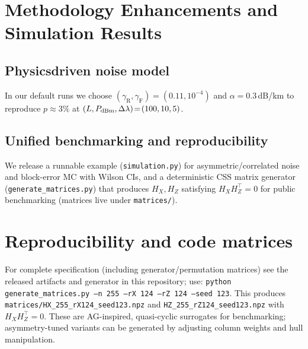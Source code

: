\documentclass[conference]{IEEEtran}
\begin{document}
\section{Methodology Enhancements and Simulation Results}\label{sec:enhancements}
\subsection{Physics\textendash driven noise model}
In our default runs we choose $(\gamma_{\mathrm{R}},\gamma_{\mathrm{F}})\!=\!(0.11,10^{-4})$ and $\alpha\!=\!0.3$\,dB/km to reproduce $p\!\approx\!3\%$ at $(L,P_{\rm dBm},\Delta\lambda)\!=\!(100,10,5)$.
\subsection{Unified benchmarking and reproducibility}
We release a runnable example (\texttt{simulation.py}) for asymmetric/correlated noise and block-error MC with Wilson CIs, and a deterministic CSS matrix generator (\texttt{generate\_matrices.py}) that produces $H_X,H_Z$ satisfying $H_XH_Z^\top\!=\!0$ for public benchmarking (matrices live under \texttt{matrices/}).

\appendix \section{Reproducibility and code matrices}
For complete specification (including generator/permutation matrices) see the released artifacts and generator in this repository; use:
\texttt{python generate\_matrices.py --n 255 --rX 124 --rZ 124 --seed 123}.
This produces \texttt{matrices/HX\_255\_rX124\_seed123.npz} and \texttt{HZ\_255\_rZ124\_seed123.npz} with $H_XH_Z^\top\!=\!0$.
These are AG-inspired, quasi-cyclic surrogates for benchmarking; asymmetry-tuned variants can be generated by adjusting column weights and hull manipulation.
\end{document}
